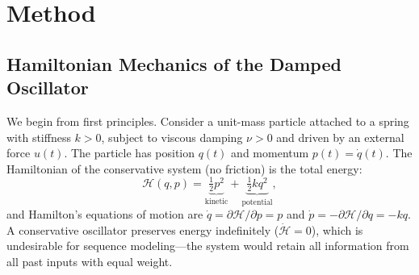 \documentclass[11pt]{article}
\begin{document}
\section{Method}
\label{sec:method}

\subsection{Hamiltonian Mechanics of the Damped Oscillator}

We begin from first principles. Consider a unit-mass particle attached to a spring with stiffness $k > 0$, subject to viscous damping $\nu > 0$ and driven by an external force $u(t)$. The particle has position $q(t)$ and momentum $p(t) = \dot{q}(t)$. The Hamiltonian of the conservative system (no friction) is the total energy:
\begin{equation}
    \mathcal{H}(q, p) = \underbrace{\tfrac{1}{2}p^2}_{\text{kinetic}} + \underbrace{\tfrac{1}{2}kq^2}_{\text{potential}},
    \label{eq:hamiltonian}
\end{equation}
and Hamilton's equations of motion are $\dot{q} = \partial\mathcal{H}/\partial p = p$ and $\dot{p} = -\partial\mathcal{H}/\partial q = -kq$. A conservative oscillator preserves energy indefinitely ($\dot{\mathcal{H}} = 0$), which is undesirable for sequence modeling---the system would retain all information from all past inputs with equal weight.
\end{document}
